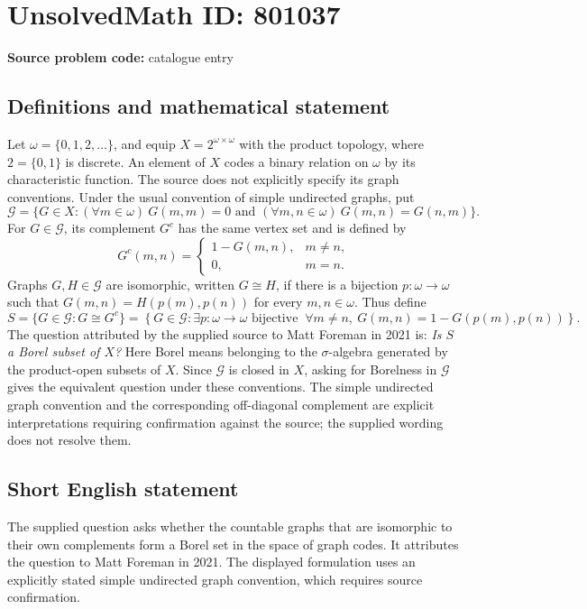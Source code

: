 \documentclass[11pt]{article}
\begin{document}
\section*{UnsolvedMath ID: 801037}
\textbf{Source problem code:} catalogue entry
\subsection{Definitions and mathematical statement}
Let \(\omega=\{0,1,2,\ldots\}\), and equip \(X=2^{\omega\times\omega}\) with the product topology, where \(2=\{0,1\}\) is discrete. An element of \(X\) codes a binary relation on \(\omega\) by its characteristic function. The source does not explicitly specify its graph conventions. Under the usual convention of simple undirected graphs, put
\[
\mathcal G=\{G\in X:(\forall m\in\omega)\ G(m,m)=0\text{ and }(\forall m,n\in\omega)\ G(m,n)=G(n,m)\}.
\]
For \(G\in\mathcal G\), its complement \(G^c\) has the same vertex set and is defined by
\[
G^c(m,n)=
\begin{cases}
1-G(m,n),&m\ne n,\\
0,&m=n.
\end{cases}
\]
Graphs \(G,H\in\mathcal G\) are isomorphic, written \(G\cong H\), if there is a bijection \(p:\omega\to\omega\) such that \(G(m,n)=H(p(m),p(n))\) for every \(m,n\in\omega\). Thus define
\[
S=\{G\in\mathcal G:G\cong G^c\}
 =\left\{G\in\mathcal G:\exists p:\omega\to\omega\text{ bijective }\ \forall m\ne n,\ G(m,n)=1-G(p(m),p(n))\right\}.
\]
The question attributed by the supplied source to Matt Foreman in 2021 is: \emph{Is \(S\) a Borel subset of \(X\)?} Here Borel means belonging to the \(\sigma\)-algebra generated by the product-open subsets of \(X\). Since \(\mathcal G\) is closed in \(X\), asking for Borelness in \(\mathcal G\) gives the equivalent question under these conventions. The simple undirected graph convention and the corresponding off-diagonal complement are explicit interpretations requiring confirmation against the source; the supplied wording does not resolve them.
\subsection{Short English statement}
The supplied question asks whether the countable graphs that are isomorphic to their own complements form a Borel set in the space of graph codes. It attributes the question to Matt Foreman in 2021. The displayed formulation uses an explicitly stated simple undirected graph convention, which requires source confirmation.
\end{document}
